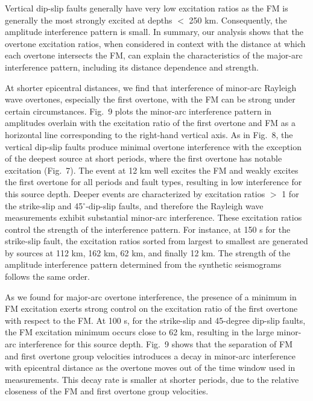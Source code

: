 \documentclass[extra,mreferee]{gji}
\begin{document}
Vertical dip-slip faults generally have very low excitation ratios as the FM is generally the most strongly excited at depths $<$ 250 km. Consequently, the amplitude interference pattern is small. In summary, our analysis shows that the overtone excitation ratios, when considered in context with the distance at which each overtone intersects the FM, can explain the characteristics of the major-arc interference pattern, including its distance dependence and strength. 

At shorter epicentral distances, we find that  interference of minor-arc Rayleigh wave overtones, especially the first overtone, with the FM can be strong under certain circumstances. Fig.\ 9 plots the minor-arc interference pattern in amplitudes overlain with the excitation ratio of the first overtone and FM as a horizontal line corresponding to the right-hand vertical axis. As in Fig.\ 8, the vertical dip-slip faults produce minimal overtone interference with the exception of the deepest source at short periods, where the first overtone has notable excitation (Fig.\ 7). The event at 12 km well excites the FM and weakly excites the first overtone for all periods and fault types, resulting in low interference for this source depth. Deeper events are characterized by excitation ratios $>$ 1 for the strike-slip and 45$^\circ$-dip-slip faults, and therefore the Rayleigh wave measurements exhibit substantial minor-arc interference. These excitation ratios control the strength of the interference pattern. For instance, at 150 s for the strike-slip fault, the excitation ratios sorted from largest to smallest are generated by sources at 112 km, 162 km, 62 km, and finally 12 km. The strength of the amplitude interference pattern determined from the synthetic seismograms follows the same order. 

As we found for major-arc overtone interference, the presence of a minimum in FM excitation exerts strong control on the excitation ratio of the first overtone with respect to the FM. At 100 s, for the strike-slip and 45-degree dip-slip faults, the FM excitation minimum occurs close to 62 km, resulting in the large minor-arc interference for this source depth. Fig.\ 9 shows that the separation of FM and first overtone group velocities introduces a decay in minor-arc interference with epicentral distance as the overtone moves out of the time window used in measurements. This decay rate is smaller at shorter periods, due to the relative closeness of the FM and first overtone group velocities.
\end{document}
